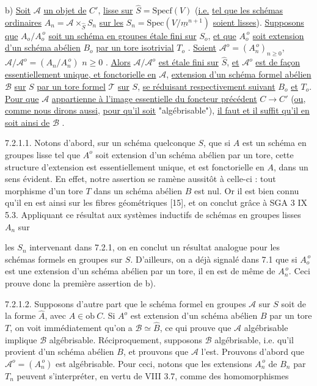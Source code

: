 b) \underline{Soit} $\mathcal{A}$ \underline{un objet de} $C'$, \underline{lisse sur} $\hat{S} = \mathrm{Specf}(V)$ (\underline{i.e.} \underline{tel que les schémas ordinaires} $A_n = \mathcal{A} \times_{\hat{S}} S_n$ \underline{sur les} $S_n = \mathrm{Spec}(V/\underline{m}^{n+1})$ \underline{soient lisses}). \underline{Supposons que} $A_o/A_o^{\,o}$ \underline{soit un schéma en groupes étale fini sur} $S_o$, \underline{et que} $A_o^{\,o}$ \underline{soit extension d'un schéma abélien} $B_o$ \underline{par un tore isotrivial} $T_o$ . \underline{Soient} $\mathcal{A}^o = (A_n^{\,o})_{n \geq 0}$, $\mathcal{A}/\mathcal{A}^o = (A_n/A_n^{\,o})$ $n \geq 0$ . \underline{Alors} $\mathcal{A}/\mathcal{A}^o$ \underline{est étale fini sur} $\hat{S}$, \underline{et} $\mathcal{A}^o$ \underline{est de façon essentiellement unique, et fonctorielle en} $\mathcal{A}$, \underline{extension d'un schéma formel abélien} $\mathcal{B}$ \underline{sur} $S$ \underline{par un tore formel} $\mathcal{T}$ \underline{sur} $S$, \underline{se réduisant respectivement suivant} $B_o$ \underline{et} $T_o$. \underline{Pour que} $\mathcal{A}$ \underline{appartienne à l'image essentielle du foncteur précédent} $C \longrightarrow C'$ (\underline{ou}, \underline{comme nous dirons aussi}, \underline{pour qu'il soit} "algébrisable"), \underline{il faut et il suffit qu'il en soit ainsi de} $\mathcal{B}$ .

7.2.1.1. Notons d'abord, sur un schéma quelconque $S$, que si $A$ est un schéma en groupes lisse tel que $A^o$ soit extension d'un schéma abélien par un tore, cette structure d'extension est essentiellement unique, et est fonctorielle en $A$, dans un sens évident. En effet, notre assertion se ramène aussitôt à celle-ci : tout morphisme d'un tore $T$ dans un schéma abélien $B$ est nul. Or il est bien connu qu'il en est ainsi sur les fibres géométriques [15], et on conclut grâce à SGA 3 IX 5.3. Appliquant ce résultat aux systèmes inductifs de schémas en groupes lisses $A_n$ sur



les $S_n$ intervenant dans 7.2.1, on en conclut un résultat analogue pour les schémas formels en groupes sur $S$. D'ailleurs, on a déjà signalé dans 7.1 que si $A_o^{\,o}$ est une extension d'un schéma abélien par un tore, il en est de même de $A_n^{\,o}$. Ceci prouve donc la première assertion de b).

7.2.1.2. Supposons d'autre part que le schéma formel en groupes $\mathcal{A}$ sur $S$ soit de la forme $\hat{A}$, avec $A \in \mathrm{ob}\ C$. Si $A^o$ est extension d'un schéma abélien $B$ par un tore $T$, on voit immédiatement qu'on a $\mathcal{B} \simeq \hat{B}$, ce qui prouve que $\mathcal{A}$ algébrisable implique $\mathcal{B}$ algébrisable. Réciproquement, supposons $\mathcal{B}$ algébrisable, i.e. qu'il provient d'un schéma abélien $B$, et prouvons que $\mathcal{A}$ l'est. Prouvons d'abord que $\mathcal{A}^o = (A_n^{\,o})$ est algébrisable. Pour ceci, notons que les extensions $A_n^{\,o}$ de $B_n$ par $T_n$ peuvent s'interpréter, en vertu de VIII 3.7, comme des homomorphismes

